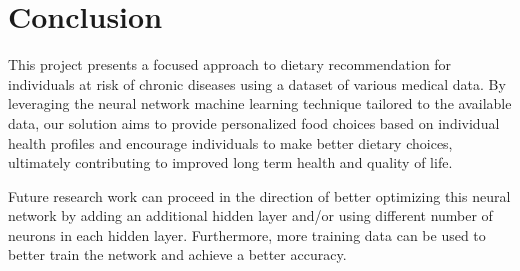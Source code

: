 \section{Conclusion}
This project presents a focused approach to dietary recommendation for individuals at risk of chronic diseases using a dataset of various medical data. By leveraging the neural network machine learning technique tailored to the available data, our solution aims to provide personalized food choices based on individual health profiles and encourage individuals to make better dietary choices, ultimately contributing to improved long term health and quality of life.

Future research work can proceed in the direction of better optimizing this neural network by adding an additional hidden layer and/or using different number of neurons in each hidden layer. Furthermore, more training data can be used to better train the network and achieve a better accuracy.
